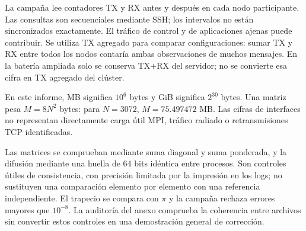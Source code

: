 La campaña lee contadores TX y RX antes y después en cada nodo participante. Las consultas son secuenciales mediante SSH; los intervalos no están sincronizados exactamente. El tráfico de control y de aplicaciones ajenas puede contribuir. Se utiliza TX agregado para comparar configuraciones: sumar TX y RX entre todos los nodos contaría ambas observaciones de muchos mensajes. En la batería ampliada solo se conserva TX+RX del servidor; no se convierte esa cifra en TX agregado del clúster.

En este informe, MB significa $10^6$ bytes y GiB significa $2^{30}$ bytes. Una matriz pesa $M=8N^2$ bytes: para $N=3072$, $M=75.497472$ MB. Las cifras de interfaces no representan directamente carga útil MPI, tráfico radiado o retransmisiones TCP identificadas.

Las matrices se comprueban mediante suma diagonal y suma ponderada, y la difusión mediante una huella de 64 bits idéntica entre procesos. Son controles útiles de consistencia, con precisión limitada por la impresión en los logs; no sustituyen una comparación elemento por elemento con una referencia independiente. El trapecio se compara con $\pi$ y la campaña rechaza errores mayores que $10^{-8}$. La auditoría del anexo comprueba la coherencia entre archivos sin convertir estos controles en una demostración general de corrección.
